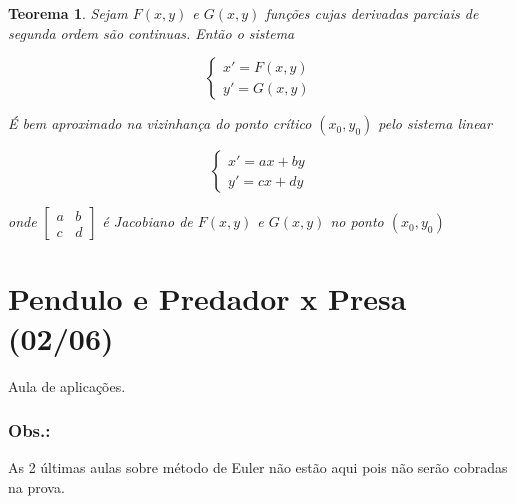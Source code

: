 \documentclass[12pt]{article}
\newtheorem{theorem}{Teorema}[section]
\begin{document}
\begin{theorem}
    Sejam $F(x, y)$ e $G(x, y)$ funções cujas derivadas parciais de segunda ordem são continuas. Então o sistema
    
    $$ \left \{
    \begin{array}{ll}
        x' = F(x, y) \\
        y' = G(x, y)
    \end{array} \right .
    $$
    
    É bem aproximado na vizinhança do ponto crítico $(x_0, y_0)$ pelo sistema linear
    
    $$ \left \{
    \begin{array}{ll}
        x' = a x + b y \\
        y' = c x + d y
    \end{array} \right .
    $$
    
    onde $\left [ \begin{array}{cc}
        a & b \\
        c & d
    \end{array} \right ]$ é Jacobiano de $F(x, y)$ e $G(x, y)$ no ponto $(x_0, y_0)$
\end{theorem}

\section{Pendulo e Predador x Presa (02/06)}
Aula de aplicações.

\subsubsection*{Obs.:} As 2 últimas aulas sobre método de Euler não estão aqui pois não serão cobradas na prova.
\end{document}
